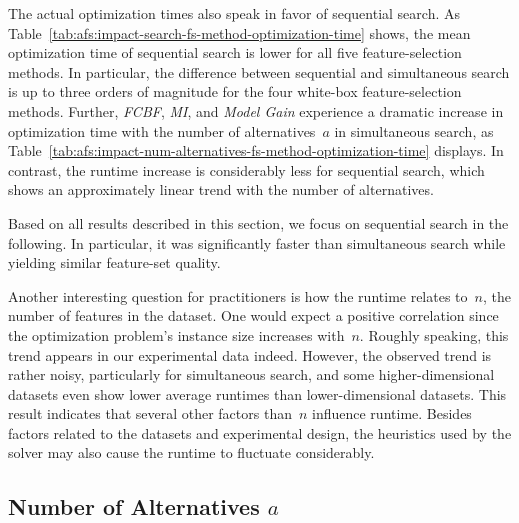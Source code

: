 \documentclass{article}
\theoremstyle{definition}
\begin{document}
The actual optimization times also speak in favor of sequential search.
As Table~\ref{tab:afs:impact-search-fs-method-optimization-time} shows, the mean optimization time of sequential search is lower for all five feature-selection methods.
In particular, the difference between sequential and simultaneous search is up to three orders of magnitude for the four white-box feature-selection methods.
Further, \emph{FCBF}, \emph{MI}, and \emph{Model Gain} experience a dramatic increase in optimization time with the number of alternatives~$a$ in simultaneous search, as Table~\ref{tab:afs:impact-num-alternatives-fs-method-optimization-time} displays.
In contrast, the runtime increase is considerably less for sequential search, which shows an approximately linear trend with the number of alternatives.

Based on all results described in this section, we focus on sequential search in the following.
In particular, it was significantly faster than simultaneous search while yielding similar feature-set quality.

Another interesting question for practitioners is how the runtime relates to~$n$, the number of features in the dataset.
One would expect a positive correlation since the optimization problem's instance size increases with~$n$.
Roughly speaking, this trend appears in our experimental data indeed.
However, the observed trend is rather noisy, particularly for simultaneous search, and some higher-dimensional datasets even show lower average runtimes than lower-dimensional datasets.
This result indicates that several other factors than~$n$ influence runtime.
Besides factors related to the datasets and experimental design, the heuristics used by the solver may also cause the runtime to fluctuate considerably.

\subsection{Number of Alternatives \texorpdfstring{$a$}{}}
\label{sec:afs:evaluation:num-alternatives}
\end{document}

